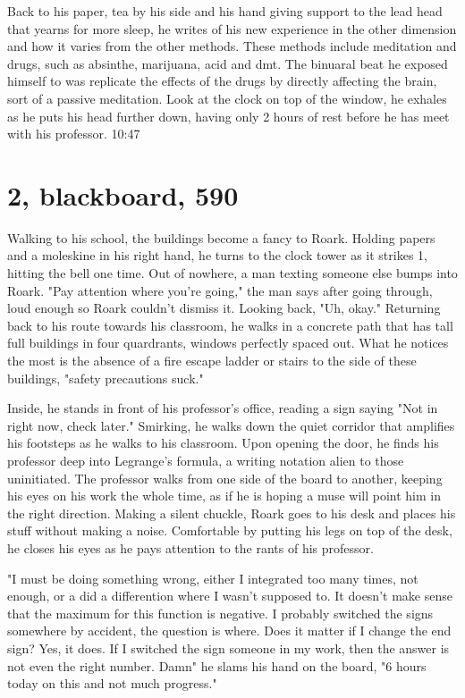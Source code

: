 		Back to his paper, tea by his side and his hand giving support to the lead head that yearns for more sleep, he writes of his new
	experience in the other dimension and how it varies from the other methods.  These methods include meditation and drugs, such as absinthe,
	marijuana, acid and dmt. The binuaral beat he exposed himself to was replicate the effects of the drugs by directly affecting the brain, sort
	of a passive meditation. Look at the clock on top of the window, he exhales as he puts his head further down, having only 2 hours of rest
	before he has meet with his professor. {10:47}

\section{2, blackboard, 590}

		Walking to his school, the buildings become a fancy to Roark. Holding papers and a moleskine in his right hand, he turns to the
	clock tower as it strikes 1, hitting the bell one time. Out of nowhere, a man texting someone else bumps into Roark. "Pay attention where
	you're going," the man says after going through, loud enough so Roark couldn't dismiss it. Looking back, "Uh, okay." Returning back to his
	route towards his classroom, he walks in a concrete path that has tall full buildings in four quardrants, windows perfectly spaced out. 
	What he notices the most is the absence of a fire escape ladder or stairs to the side of these buildings, "safety precautions suck."

		Inside, he stands in front of his professor's office, reading a sign saying "Not in right now, check later." Smirking, he walks
	down the quiet corridor that amplifies his footsteps as he walks to his classroom. Upon opening the door, he finds his professor deep into
	Legrange's formula, a writing notation alien to those uninitiated. The professor walks from one side of the board to another, keeping his
	eyes on his work the whole time, as if he is hoping a muse will point him in the right direction. Making a silent chuckle, Roark goes to his
	desk and places his stuff without making a noise. Comfortable by putting his legs on top of the desk, he closes his eyes as he pays attention
	to the rants of his professor.

		"I must be doing something wrong, either I integrated too many times, not enough, or a did a differention where I wasn't supposed to.
	It doesn't make sense that the maximum for this function is negative. I probably switched the signs somewhere by accident, the question is
	where. Does it matter if I change the end sign? Yes, it does. If I switched the sign someone in my work, then the answer is not even the 
	right number. Damn" he slams his hand on the board, "6 hours today on this and not much progress."

